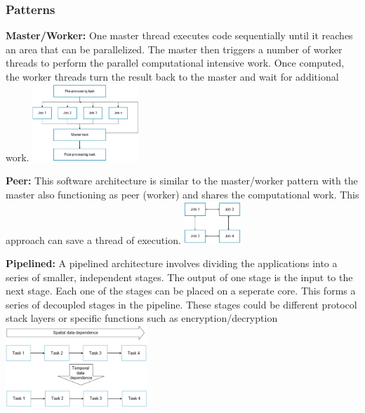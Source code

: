 \subsubsection{Patterns}
\begin{paracol}{2}
    \textbf{Master/Worker:} One master thread executes code sequentially until it reaches an area that can be parallelized.
    The master then triggers a number of worker threads to perform the parallel computational intensive work.
    Once computed, the worker threads turn the result back to the master and wait for additional work.\newline
    \switchcolumn
    \includegraphics[width=0.3\textwidth]{images/Multicore/master_worker}
\end{paracol}

\begin{paracol}{2}
    \textbf{Peer:} This software architecture is similar to the master/worker pattern with the master also functioning as peer (worker) and shares the computational work.
    This approach can save a thread of execution.\newline
    \switchcolumn
    \includegraphics[width=0.16\textwidth]{images/Multicore/peer}
\end{paracol}

\begin{paracol}{2}
    \textbf{Pipelined:} A pipelined architecture involves dividing the applications into a series of smaller, independent stages.
    The output of one stage is the input to the next stage.
    Each one of the stages can be placed on a seperate core.
    This forms a series of decoupled stages in the pipeline.
    These stages could be different protocol stack layers or specific functions such as encryption/decryption
    \switchcolumn
    \includegraphics[width=0.4\textwidth]{images/Multicore/pipelined}
\end{paracol}

